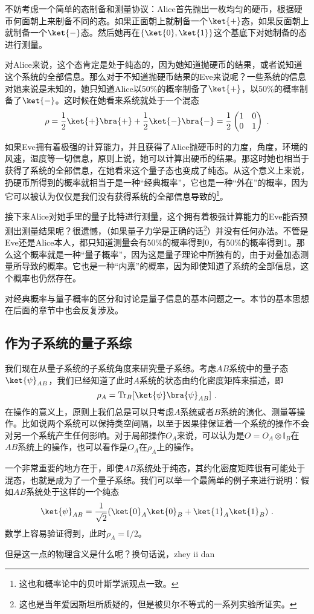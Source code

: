 不妨考虑一个简单的态制备和测量协议：Alice首先抛出一枚均匀的硬币，根据硬币何面朝上来制备不同的态。如果正面朝上就制备一个$\ket{+}$态，如果反面朝上就制备一个$\ket{-}$态。然后她再在$\{\ket{0},\ket{1}\}$这个基底下对她制备的态进行测量。

对Alice来说，这个态肯定是处于纯态的，因为她知道抛硬币的结果，或者说知道这个系统的全部信息。那么对于不知道抛硬币结果的Eve来说呢？一些系统的信息对她来说是未知的，她只知道Alice以50\%的概率制备了$\ket{+}$，以50\%的概率制备了$\ket{-}$。这时候在她看来系统就处于一个混态
\begin{equation}
\rho=\frac{1}{2}\ket{+}\bra{+}+\frac{1}{2}\ket{-}\bra{-}=\frac{1}{2}\begin{pmatrix}
1 & 0\\
0 & 1
\end{pmatrix}~.
\end{equation}

如果Eve拥有着极强的计算能力，并且获得了Alice抛硬币时的力度，角度，环境的风速，湿度等一切信息，原则上说，她可以计算出硬币的结果。那这时她也相当于获得了系统的全部信息，在她看来这个量子态也变成了纯态。从这个意义上来说，扔硬币所得到的概率就相当于是一种“经典概率”，它也是一种“外在”的概率，因为它可以被认为仅仅是我们没有获得系统的全部信息导致的\footnote{这也和概率论中的贝叶斯学派观点一致。}。

接下来Alice对她手里的量子比特进行测量，这个拥有着极强计算能力的Eve能否预测出测量结果呢？很遗憾，（如果量子力学是正确的话\footnote{这也是当年爱因斯坦所质疑的，但是被贝尔不等式的一系列实验所证实。}）并没有任何办法。不管是Eve还是Alice本人，都只知道测量会有50\%的概率得到0，有50\%的概率得到1。那么这个概率就是一种“量子概率”，因为这是量子理论中所独有的，由于对叠加态测量所导致的概率。它也是一种“内禀”的概率，因为即使知道了系统的全部信息，这个概率也仍然存在。

对经典概率与量子概率的区分和讨论是量子信息的基本问题之一。本节的基本思想在后面的章节中也会反复涉及。

\subsection{作为子系统的量子系综}


我们现在从量子系统的子系统角度来研究量子系综。考虑$AB$系统中的量子态$\ket{\psi}_{AB}$，我们已经知道了此时$A$系统的状态由约化密度矩阵来描述，即
\begin{equation}
\rho_A=\operatorname{Tr}_B[\ket{\psi}\bra{\psi}_{AB}]~.
\end{equation}
在操作的意义上，原则上我们总是可以只考虑$A$系统或者$B$系统的演化、测量等操作。比如说两个系统可以保持类空间隔，以至于因果律保证着一个系统的操作不会对另一个系统产生任何影响。对于局部操作$O_A$来说，可以认为是$O=O_A\otimes\mathbb{I}_B$在$AB$系统上的操作，也可以看作是$O_A$在$\rho_A$上的操作。

一个非常重要的地方在于，即使$AB$系统处于纯态，其约化密度矩阵很有可能处于混态，也就是成为了一个量子系综。我们可以举一个最简单的例子来进行说明：假如$AB$系统处于这样的一个纯态
\begin{equation}
\ket{\psi}_{AB}=\frac{1}{\sqrt{2}}(\ket{0}_A\ket{0}_B+\ket{1}_A\ket{1}_B)~.
\end{equation}
数学上容易验证得到，此时$\rho_A=\mathbb{I}/2$。

但是这一点的物理含义是什么呢？换句话说，zhey ii dan



